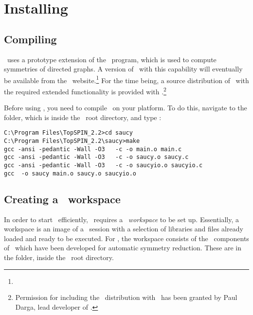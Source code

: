 \section{Installing}\label{sec:downloadandinstall:installation}

\subsection{Compiling \saucy}\label{sec:downloadandinstall:installation:compilingsaucy}

\topspin\ uses a prototype extension of the \saucy\ program, which
is used to compute symmetries of directed graphs.  A version of
\saucy\ with this capability will eventually be available from the
\saucy\ website.\footnote{\texttt{\saucywebpage}} For the time
being, a source distribution of \saucy\ with the required extended
functionality is provided with \topspin.\footnote{Permission for
including the \saucy\ distribution with \topspin\ has been granted
by Paul Darga, lead developer of \saucy.}

Before using \topspin, you need to compile \saucy\ on your platform.
To do this, navigate to the  folder, which is inside
the \topspin\ root directory, and type :
%
\begin{lstlisting}
C:\Program Files\TopSPIN_2.2>cd saucy
C:\Program Files\TopSPIN_2.2\saucy>make
gcc -ansi -pedantic -Wall -O3   -c -o main.o main.c
gcc -ansi -pedantic -Wall -O3   -c -o saucy.o saucy.c
gcc -ansi -pedantic -Wall -O3   -c -o saucyio.o saucyio.c
gcc  -o saucy main.o saucy.o saucyio.o
\end{lstlisting}
%
\subsection{Creating a \protect\gap\ workspace}\label{sec:downloadandinstall:gapworkspace}
%
In order to start \gap\ efficiently, \topspin\ requires a \gap\
\emph{workspace} to be set up.  Essentially, a workspace is an image
of a \gap\ session with a selection of libraries and files already
loaded and ready to be executed.  For \topspin, the workspace
consists of the \gap\ components of \topspin\ which have been
developed for automatic symmetry reduction.  These are in the
 folder, inside the \topspin\ root directory.

